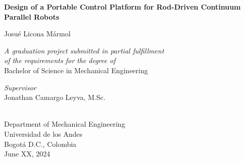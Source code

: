 \begin{titlepage}
    \begin{spacing}{1}
    \hypertarget{titlepage}{} %
    \begin{center}
        \vspace*{0.5cm}

        \LARGE
        \textbf{Design of a Portable Control Platform for Rod-Driven Continuum Parallel Robots}

        \vspace{2cm}
        \Large
        Josué Licona Mármol

        \large
        \vspace{1.5cm}
        \textit{A graduation project submitted in partial fulfillment \\
        of the requirements for the degree of} \\
        \vspace{0.5cm}
        Bachelor of Science in Mechanical Engineering

        \vspace{1.5cm}
        \textit{Supervisor} \\
        Jonathan Camargo Leyva, M.Sc.

        \vspace{1cm}
        \vspace{1cm}
        \\
        Department of Mechanical Engineering\\
        Universidad de los Andes\\
        Bogotá D.C., Colombia\\
        June XX, 2024
    \end{center}
    \end{spacing}
\end{titlepage}
\setcounter{page}{2}
\normalsize